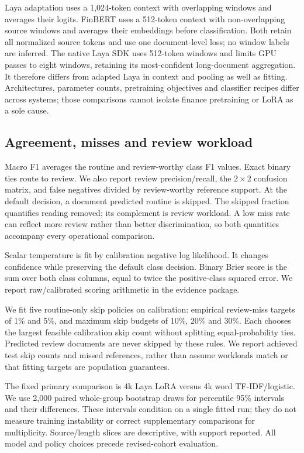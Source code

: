 \documentclass[11pt,a4paper]{article}
\begin{document}
Laya adaptation uses a 1,024-token context with overlapping windows and averages
their logits. FinBERT uses a 512-token context with non-overlapping source windows
and averages their embeddings before classification. Both retain all normalized
source tokens and use one document-level loss; no window labels are inferred.
The native Laya SDK uses 512-token windows and limits GPU passes to eight windows,
retaining its most-confident long-document aggregation. It therefore differs from
adapted Laya in context and pooling as well as fitting. Architectures, parameter counts,
pretraining objectives and classifier recipes differ across systems; those
comparisons cannot isolate finance pretraining or LoRA as a sole cause.

\subsection{Agreement, misses and review workload}
Macro F1 averages the routine and review-worthy class F1 values. Exact binary
ties route to review. We also report review precision/recall, the $2\times2$
confusion matrix, and false negatives divided by review-worthy reference
support. At the default decision, a document predicted routine is skipped.
The skipped fraction quantifies reading removed; its complement is review
workload. A low miss rate can reflect more review rather than better
discrimination, so both quantities accompany every operational comparison.

Scalar temperature is fit by calibration negative log likelihood. It changes
confidence while preserving the default class decision. Binary Brier score is
the sum over both class columns, equal to twice the positive-class squared
error. We report raw/calibrated scoring arithmetic in the evidence package.

We fit five routine-only skip policies on calibration: empirical review-miss
targets of 1\% and 5\%, and maximum skip budgets of 10\%, 20\% and 30\%.
Each chooses the largest feasible calibration skip count without splitting
equal-probability ties. Predicted review documents are never skipped by these
rules. We report achieved test skip counts and missed references, rather than
assume workloads match or that fitting targets are population guarantees.

The fixed primary comparison is 4k Laya LoRA versus 4k word TF-IDF/logistic.
We use 2,000 paired whole-group bootstrap draws for percentile 95\% intervals
and their differences. These intervals condition on a single fitted run;
they do not measure training instability or correct supplementary comparisons
for multiplicity. Source/length slices are descriptive, with support reported.
All model and policy choices precede revised-cohort evaluation.
\end{document}
